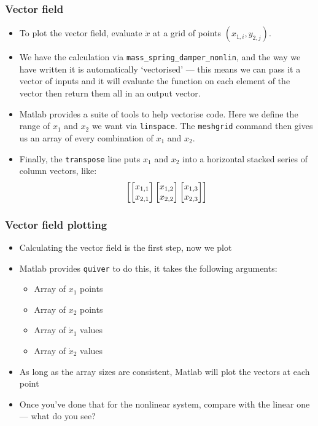 \documentclass[9pt]{beamer-control}
\begin{document}
\begin{frame}
\frametitle{Vector field}

\begin{itemize}
\item
To plot the vector field, evaluate $\dot x$ at a grid of points $(x_{1,i},y_{2,j})$.

\item
We have the calculation via \texttt{mass\_spring\_damper\_nonlin}, and the way we have written it is automatically `vectorised' --- this means we can pass it a vector of inputs and it will evaluate the function on each element of the vector then return them all in an output vector.

\item
Matlab provides a suite of tools to help vectorise code. Here we define the range of $x_1$ and $x_2$ we want via \texttt{linspace}. The \texttt{meshgrid} command then gives us an array of every combination of $x_1$ and $x_2$.

\item
Finally, the \texttt{transpose} line puts $x_1$ and $x_2$ into a horizontal stacked series of column vectors, like:
\[
   \begin{bmatrix}\begin{bmatrix}x_{1,1}\\x_{2,1}\end{bmatrix}\begin{bmatrix}x_{1,2}\\x_{2,2}\end{bmatrix}\begin{bmatrix}x_{1,3}\\x_{2,3}\end{bmatrix}\end{bmatrix}
\]
\end{itemize}


\end{frame}

\begin{frame}
\frametitle{Vector field plotting}

\begin{itemize}
\item
Calculating the vector field is the first step, now we plot
\item
Matlab provides \texttt{quiver} to do this, it takes the following arguments:
\begin{itemize}
\item Array of $x_1$ points
\item Array of $x_2$ points
\item Array of $\dot x_1$ values
\item Array of $\dot x_2$ values
\end{itemize}
\item As long as the array sizes are consistent, Matlab will plot the vectors at each point
\item Once you've done that for the nonlinear system, compare with the linear one --- what do you see?
\end{itemize}


\end{frame}
\end{document}
